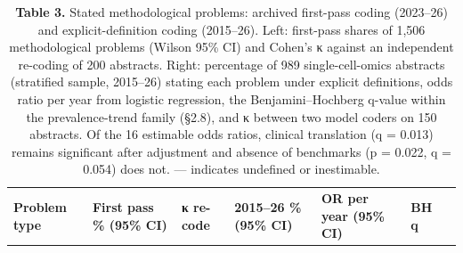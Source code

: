 \documentclass[11pt]{article}
\newenvironment{tablefont}{\par\scriptsize\setlength{\tabcolsep}{3.5pt}}{\par}
\newcommand{\thead}[1]{\textbf{#1}}
\begin{document}
\begin{tablefont}

\begin{longtable}[l]{@{}
  >{\raggedright\arraybackslash}p{}
  >{\raggedright\arraybackslash}p{}
  >{\raggedright\arraybackslash}p{}
  >{\raggedright\arraybackslash}p{}
  >{\raggedright\arraybackslash}p{}
  >{\raggedright\arraybackslash}p{}
  >{\raggedright\arraybackslash}p{}@{}}
\caption{\textbf{Table 3.} Stated methodological problems: archived first-pass
coding (2023--26) and explicit-definition coding (2015--26). Left:
first-pass shares of 1,506 methodological problems (Wilson 95\% CI) and
Cohen's κ against an independent re-coding of 200 abstracts. Right:
percentage of 989 single-cell-omics abstracts (stratified sample,
2015--26) stating each problem under explicit definitions, odds ratio
per year from logistic regression, the Benjamini--Hochberg q-value
within the prevalence-trend family (§2.8), and κ between two model
coders on 150 abstracts. Of the 16 estimable odds ratios, clinical
translation (q = 0.013) remains significant after adjustment and absence
of benchmarks (p = 0.022, q = 0.054) does not. --- indicates undefined
or inestimable.}\tabularnewline
\toprule
\begin{minipage}[b]{\linewidth}\raggedright
\thead{Problem type}
\end{minipage} & \begin{minipage}[b]{\linewidth}\raggedright
\thead{First pass \% (95\% CI)}
\end{minipage} & \begin{minipage}[b]{\linewidth}\raggedright
\thead{κ re-code}
\end{minipage} & \begin{minipage}[b]{\linewidth}\raggedright
\thead{2015--26 \% (95\% CI)}
\end{minipage} & \begin{minipage}[b]{\linewidth}\raggedright
\thead{OR per year (95\% CI)}
\end{minipage} & \begin{minipage}[b]{\linewidth}\raggedright
\thead{BH q}
\end{minipage} & \begin{minipage}[b]{\linewidth}\raggedright

\end{minipage}
\end{longtable}
\end{tablefont}
\end{document}
